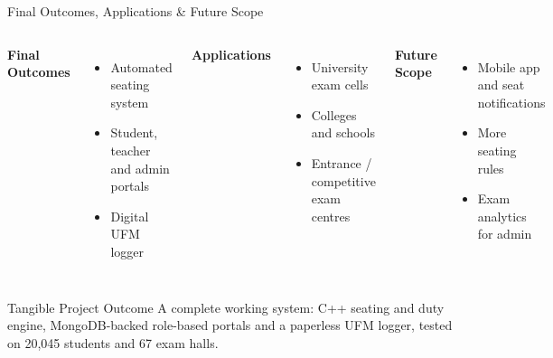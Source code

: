 \documentclass[aspectratio=169,11pt]{beamer}
\begin{document}
\begin{frame}{Final Outcomes, Applications \& Future Scope}

\begin{columns}[T,totalwidth=\textwidth]


\textbf{\color{GEUBlue}Final Outcomes}

\begin{itemize}\itemsep3pt
    \small
    \item Automated seating system
    \item Student, teacher and admin portals
    \item Digital UFM logger
\end{itemize}


\textbf{\color{GEUBlue}Applications}

\begin{itemize}\itemsep3pt
    \small
    \item University exam cells
    \item Colleges and schools
    \item Entrance / competitive exam centres
\end{itemize}


\textbf{\color{GEUBlue}Future Scope}

\begin{itemize}\itemsep3pt
    \small
    \item Mobile app and seat notifications
    \item More seating rules
    \item Exam analytics for admin
\end{itemize}

\end{columns}

\vspace{5mm}

\begin{block}{Tangible Project Outcome}
\small
A complete working system: C++ seating and duty engine, MongoDB-backed
role-based portals and a paperless UFM logger, tested on 20,045 students and
67 exam halls.
\end{block}

\end{frame}
\end{document}
